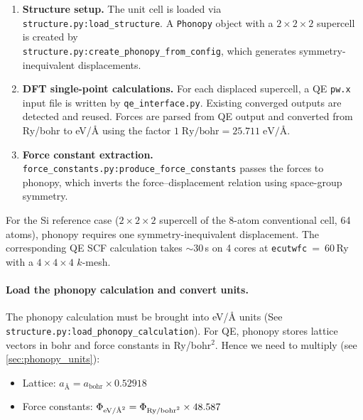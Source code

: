 \begin{enumerate}
  \item \textbf{Structure setup.}
        The unit cell is loaded via \texttt{structure.py:load\_structure}.
        A \texttt{Phonopy} object with a $2\times2\times2$ supercell is
        created by \\ \texttt{structure.py:create\_phonopy\_from\_config},
        which generates symmetry-inequivalent displacements.

  \item \textbf{DFT single-point calculations.}
        For each displaced supercell, a QE \texttt{pw.x} input file is
        written by \texttt{qe\_interface.py}.
        Existing converged outputs are detected and reused.
        Forces are parsed from QE output and converted from
        Ry/bohr to eV/\AA{} using the factor
        $1\;\text{Ry/bohr} = 25.711\;\text{eV/\AA}$.

  \item \textbf{Force constant extraction.}
        \texttt{force\_constants.py:produce\_force\_constants}
        passes the forces to phonopy, which inverts the
        force--displacement relation using space-group symmetry.

\end{enumerate}

For the Si reference case ($2\times2\times2$ supercell of the
8-atom conventional cell, 64 atoms), phonopy requires one
symmetry-inequivalent displacement.  The corresponding QE SCF
calculation takes $\sim$30\,s on 4 cores at \texttt{ecutwfc}~=~60\,Ry
with a $4\times4\times4$ $k$-mesh.

\paragraph{Load the phonopy calculation and convert units.}
The phonopy calculation must be brought into eV/\AA{} units (See \texttt{structure.py:load\_phonopy\_calculation}).
For QE, phonopy stores lattice vectors in bohr and
force constants in Ry/bohr$^2$.  Hence we need to multiply (see \cref{sec:phonopy_units}):
\begin{itemize}
  \item Lattice: $a_\text{\AA} = a_\text{bohr} \times 0.52918$
  \item Force constants: $\Phi_{\text{eV/\AA\textsuperscript{2}}} = \Phi_{\text{Ry/bohr\textsuperscript{2}}} \times 48.587$
\end{itemize}

